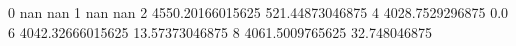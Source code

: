 0 nan nan
1 nan nan
2 4550.20166015625 521.44873046875
4 4028.7529296875 0.0
6 4042.32666015625 13.57373046875
8 4061.5009765625 32.748046875
